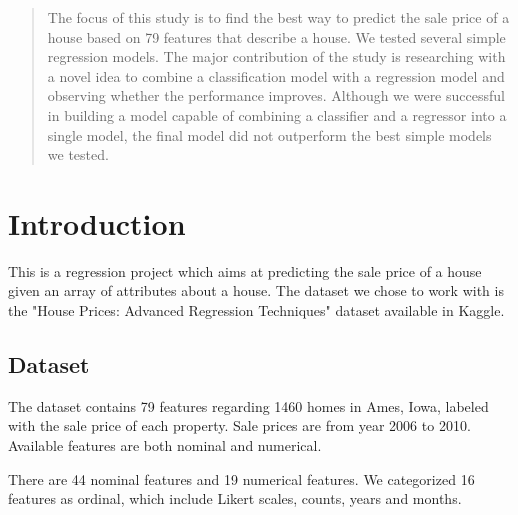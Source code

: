 \documentclass[conference,compsoc]{IEEEtran}
\begin{document}
\maketitle

\begin{abstract}
The focus of this study is to find the best way to predict the sale price of a house based on 79 features that describe a house. We tested several simple regression models. The major contribution of the study is researching with a novel idea to combine a classification model with a regression model and observing whether the performance improves. Although we were successful in building a model capable of combining a classifier and a regressor into a single model, the final model did not outperform the best simple models we tested.
\end{abstract}





%
\IEEEpeerreviewmaketitle



\section{Introduction}
This is a regression project which aims at predicting the sale price of a house given an array of attributes about a house. The dataset we chose to work with is the "House Prices: Advanced Regression Techniques" dataset available in Kaggle.

\subsection{Dataset}
\par
The dataset contains 79 features regarding 1460 homes in Ames, Iowa, labeled with the sale price of each property. Sale prices are from year 2006 to 2010. Available features are both nominal and numerical.

\par
There are 44 nominal features and 19 numerical features. We categorized 16 features as ordinal, which include Likert scales, counts, years and months.
\end{document}
